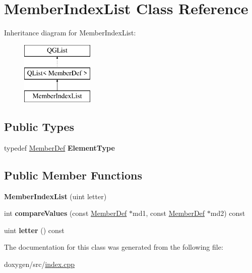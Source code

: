\hypertarget{class_member_index_list}{}\section{Member\+Index\+List Class Reference}
\label{class_member_index_list}
Inheritance diagram for Member\+Index\+List\+:\begin{figure}[H]
\begin{center}
\leavevmode
\includegraphics[height=3.000000cm]{class_member_index_list}
\end{center}
\end{figure}
\subsection*{Public Types}
\begin{DoxyCompactItemize}
\item 
\mbox{\label{class_member_index_list_afff05ebbca3ee767d3ddaf9df56bfc20}} 
typedef \mbox{\hyperlink{class_member_def}{Member\+Def}} {\bfseries Element\+Type}
\end{DoxyCompactItemize}
\subsection*{Public Member Functions}
\begin{DoxyCompactItemize}
\item 
\mbox{\label{class_member_index_list_a5c669d61e181f2fb8d7cf29994bfed6c}} 
{\bfseries Member\+Index\+List} (uint letter)
\item 
\mbox{\label{class_member_index_list_a0c95263380297041b3cb1f0355e22569}} 
int {\bfseries compare\+Values} (const \mbox{\hyperlink{class_member_def}{Member\+Def}} $\ast$md1, const \mbox{\hyperlink{class_member_def}{Member\+Def}} $\ast$md2) const
\item 
\mbox{\label{class_member_index_list_afe16f9593e1d41a1c4d9fe7094573f7b}} 
uint {\bfseries letter} () const
\end{DoxyCompactItemize}


The documentation for this class was generated from the following file\+:\begin{DoxyCompactItemize}
\item 
doxygen/src/\mbox{\hyperlink{index_8cpp}{index.\+cpp}}\end{DoxyCompactItemize}
